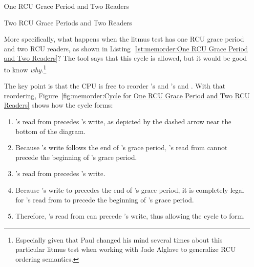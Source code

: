 \begin{listing}[tb]

\caption{One RCU Grace Period and Two Readers}
\label{lst:memorder:One RCU Grace Period and Two Readers}
\end{listing}

\begin{listing}[tb]

\caption{Two RCU Grace Periods and Two Readers}
\label{lst:memorder:Two RCU Grace Periods and Two Readers}
\end{listing}

More specifically, what happens when the litmus test has one RCU grace
period and two RCU readers, as shown in
Listing~\ref{lst:memorder:One RCU Grace Period and Two Readers}?
The  tool says that this cycle is allowed, but it would be
good to know \emph{why}.\footnote{
	Especially given that Paul changed his mind several times about
	this particular litmus test when working with Jade Alglave to
	generalize RCU ordering semantics.}

The key point is that the CPU is free to reorder 's and 's
 and .
With that reordering,
Figure~\ref{fig:memorder:Cycle for One RCU Grace Period and Two RCU Readers}
shows how the cycle forms:

\begin{enumerate}
\item	{}'s read from  precedes 's write, as
	depicted by the dashed arrow near the bottom of the diagram.
\item	Because 's write follows the end of 's grace period,
	's read from  cannot precede the beginning of
	's grace period.
\item	{}'s read from  precedes 's write.
\item	Because 's write to  precedes the end of
	's grace period, it is completely legal for 's
	read from  to precede the beginning of 's grace period.
\item	Therefore, 's read from  can precede 's
	write, thus allowing the cycle to form.
\end{enumerate}

